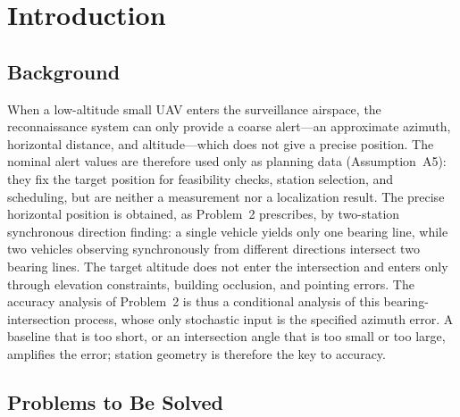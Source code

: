 \section{Introduction}
\label{sec:introduction}

\subsection{Background}

When a low-altitude small UAV enters the surveillance airspace, the reconnaissance system can only provide a coarse alert---an approximate azimuth, horizontal distance, and altitude---which does not give a precise position. The nominal alert values are therefore used only as planning data (Assumption~A5): they fix the target position for feasibility checks, station selection, and scheduling, but are neither a measurement nor a localization result. The precise horizontal position is obtained, as Problem~2 prescribes, by two-station synchronous direction finding: a single vehicle yields only one bearing line, while two vehicles observing synchronously from different directions intersect two bearing lines. The target altitude does not enter the intersection and enters only through elevation constraints, building occlusion, and pointing errors. The accuracy analysis of Problem~2 is thus a conditional analysis of this bearing-intersection process, whose only stochastic input is the specified azimuth error. A baseline that is too short, or an intersection angle that is too small or too large, amplifies the error; station geometry is therefore the key to accuracy.

\subsection{Problems to Be Solved}

